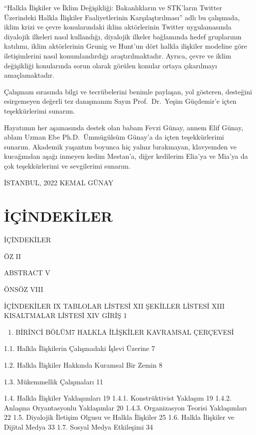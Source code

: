 \documentclass[
]{book}
\providecommand{\tightlist}{%
  \setlength{\itemsep}{0pt}\setlength{\parskip}{0pt}}
\begin{document}
``Halkla İlişkiler ve İklim Değişikliği: Bakanlıkların ve STK'ların Twitter Üzerindeki Halkla İlişkiler Faaliyetlerinin Karşılaştırılması'' adlı bu çalışmada, iklim krizi ve çevre konularındaki iklim aktörlerinin Twitter uygulamasında diyalojik ilkeleri nasıl kullandığı, diyalojik ilkeler bağlamında hedef gruplarının katılımı, iklim aktörlerinin Grunig ve Hunt'un dört halkla ilişkiler modeline göre iletişimlerini nasıl konumlandırdığı araştırılmaktadır. Ayrıca, çevre ve iklim değişikliği konularında sorun olarak görülen konular ortaya çıkarılmayı amaçlamaktadır.

Çalışmam sırasında bilgi ve tecrübelerini benimle paylaşan, yol gösteren, desteğini esirgemeyen değerli tez danışmanım Sayın Prof.~Dr.~Yeşim Güçdemir'e içten teşekkürlerimi sunarım.

Hayatımın her aşamasında destek olan babam Fevzi Günay, annem Elif Günay, ablam Uzman Ebe Ph.D.~Ümmügülsüm Günay'a da içten teşekkürlerimi sunarım. Akademik yaşantım boyunca hiç yalnız bırakmayan, klavyemden ve kucağımdan aşağı inmeyen kedim Mestan'a, diğer kedilerim Elia'ya ve Mia'ya da çok teşekkürlerimi ve sevgilerimi sunarım.

İSTANBUL, 2022
KEMAL GÜNAY

\hypertarget{iuxe7indekiler}{%
\chapter*{İÇİNDEKİLER}\label{iuxe7indekiler}}

İÇİNDEKİLER

ÖZ II

ABSTRACT V

ÖNSÖZ VIII

İÇİNDEKİLER IX
TABLOLAR LİSTESİ XII
ŞEKİLLER LİSTESİ XIII
KISALTMALAR LİSTESİ XIV
GİRİŞ 1

\begin{enumerate}
\def\labelenumi{\arabic{enumi}.}
\tightlist
\item
  BİRİNCİ BÖLÜM7
  HALKLA İLİŞKİLER KAVRAMSAL ÇERÇEVESİ
\end{enumerate}

1.1. Halkla İlişkilerin Çalışmadaki İşlevi Üzerine 7

1.2. Halkla İlişkiler Hakkında Kuramsal Bir Zemin 8

1.3. Mükemmellik Çalışmaları 11

1.4. Halkla İlişkiler Yaklaşımları 19
1.4.1. Konstrüktivist Yaklaşım 19
1.4.2. Anlaşma Oryantasyonlu Yaklaşımlar 20
1.4.3. Organizasyon Teorisi Yaklaşımları 22
1.5. Diyalojik İletişim Olgusu ve Halkla İlişkiler 25
1.6. Halkla İlişkiler ve Dijital Medya 33
1.7. Sosyal Medya Etkileşimi 34
\end{document}
